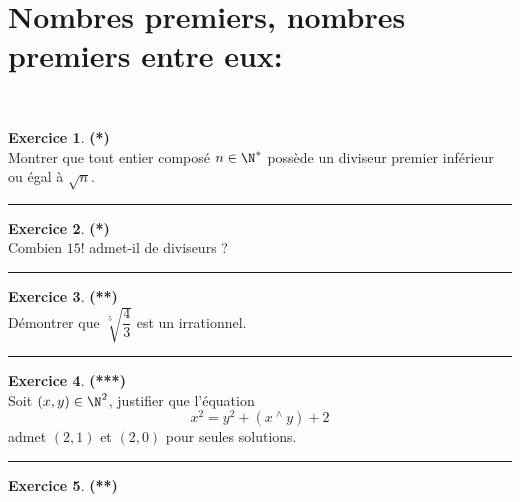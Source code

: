\documentclass[a4paper,11pt]{article}
\theoremstyle{definition}
\newtheorem{exo}{Exercice} %
\begin{document}
\section*{Nombres premiers, nombres premiers entre eux:}\hfill\\%
\begin{minipage}{1\linewidth}
	\begin{minipage}[t]{0.48\linewidth}
		\raggedright
		
		
		
		\begin{exo}\textbf{(*)}\quad\\[0.2cm]
	Montrer que tout entier composé $n \in \N^*$ possède un diviseur premier inférieur ou égal à $\sqrt{n}$.
	
	\centering
	\rule{1\linewidth}{0.6pt}
\end{exo}
		
		
		\begin{exo}\textbf{(*)}\quad\\[0.2cm]
			Combien $15!$ admet-il de diviseurs ?
			
			\centering
			\rule{1\linewidth}{0.6pt}
		\end{exo}
	
		\begin{exo}\textbf{(**)}\quad\\[0.2cm]
			Démontrer que $\sqrt[5]{\dfrac{4}{3}}$ est un irrationnel.
			
			\centering
			\rule{1\linewidth}{0.6pt}
		\end{exo}
		
			\begin{exo}\textbf{(***)}\quad\\[0.2cm]
			Soit $(x, y) \in \N^2$, justifier que l'équation $$x^2 = y^2 + (x~ ^\wedge~ y) + 2$$ admet $(2, 1)$ et $(2, 0)$ pour seules solutions.
			
			\centering
			\rule{1\linewidth}{0.6pt}
		\end{exo}
		
	\end{minipage}	
	\hfill\vrule\hfill
	\begin{minipage}[t]{0.48\linewidth}
		\raggedright
		
				\begin{exo}\textbf{(**)}\quad\\[0.2cm]
			

\end{exo}
\end{minipage}
\end{minipage}
\end{document}

